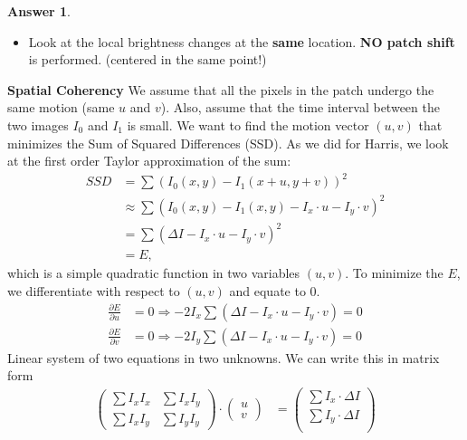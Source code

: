 \documentclass[a4paper,12 pt]{article}
\theoremstyle{definition}
\theoremstyle{remark}
\theoremstyle{definition}
\theoremstyle{definition}
\theoremstyle{definition}
\theoremstyle{definition}
\theoremstyle{remark}
\theoremstyle{remark}
\theoremstyle{definition}
\theoremstyle{definition}
\newtheorem*{answer}{Answer}
\begin{document}
\begin{enumerate}
\begin{enumerate}
\begin{answer}
\
\begin{itemize}
\item Look at the local brightness changes at the \textbf{same} location. \textbf{NO patch shift} is performed. (centered in the same point!)
\end{itemize}
\textbf{Spatial Coherency} We assume that all the pixels in the patch undergo the same motion (same $u$ and $v$). Also, assume that the time interval between the two images $I_0$ and $I_1$ is small. We want to find the motion vector $(u,v)$ that minimizes the Sum of Squared Differences (SSD). As we did for Harris, we look at the first order Taylor approximation of the sum:
\begin{equation}
\begin{split}
SSD&=\sum(I_0(x,y)-I_1(x+u,y+v))^2 \\
&\approx \sum(I_0(x,y)-I_1(x,y)-I_x\cdot u -I_y \cdot v)^2\\
&=\sum(\Delta I-I_x\cdot u - I_y \cdot v)^2\\
&= E, 
\end{split}
\end{equation}
which is a simple quadratic function in two variables $(u,v)$. To minimize the $E$, we differentiate with respect to $(u,v)$ and equate to 0.
\begin{equation}
\begin{split}
\frac{\partial E}{\partial u}&=0 \Rightarrow -2I_x \sum(\Delta I-I_x\cdot u - I_y \cdot v)=0\\
\frac{\partial E}{\partial v}&=0 \Rightarrow -2I_y \sum(\Delta I-I_x\cdot u - I_y \cdot v)=0
\end{split}
\end{equation}
Linear system of two equations in two unknowns. We can write this in matrix form
\begin{equation}
\begin{split}
\begin{pmatrix}
\sum I_xI_x & \sum I_x I_y\\
\sum I_xI_y & \sum I_y I_y
\end{pmatrix} \cdot \begin{pmatrix}
u\\ v 
 \end{pmatrix}&= \begin{pmatrix}
 \sum I_x \cdot \Delta I\\
  \sum I_y \cdot \Delta I\\
 \end{pmatrix}\\

\end{split}
\end{equation}
\end{answer}
\end{enumerate}
\end{enumerate}
\end{document}
